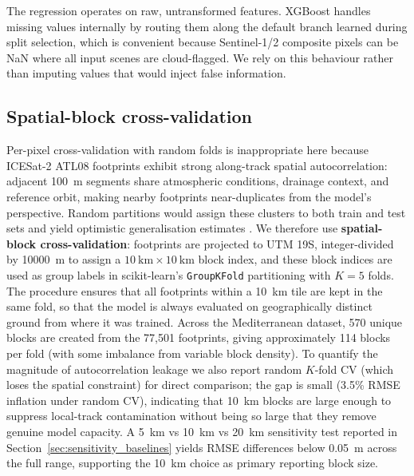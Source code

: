 \documentclass[preprint,authoryear,number]{elsarticle}
\begin{document}


The regression operates on raw, untransformed features. XGBoost handles missing values internally by routing them along the default branch learned during split selection, which is convenient because Sentinel-1/2 composite pixels can be NaN where all input scenes are cloud-flagged. We rely on this behaviour rather than imputing values that would inject false information.

\subsection{Spatial-block cross-validation}
\label{sec:spatial_cv}

Per-pixel cross-validation with random folds is inappropriate here because ICESat-2 ATL08 footprints exhibit strong along-track spatial autocorrelation: adjacent \SI{100}{\meter} segments share atmospheric conditions, drainage context, and reference orbit, making nearby footprints near-duplicates from the model's perspective. Random partitions would assign these clusters to both train and test sets and yield optimistic generalisation estimates \citep{Roberts2017SpatialCV}. We therefore use \textbf{spatial-block cross-validation}: footprints are projected to UTM 19S, integer-divided by \SI{10000}{\meter} to assign a $\SI{10}{\kilo\meter} \times \SI{10}{\kilo\meter}$ block index, and these block indices are used as group labels in scikit-learn's \texttt{GroupKFold} partitioning with $K = 5$ folds. The procedure ensures that all footprints within a \SI{10}{\kilo\meter} tile are kept in the same fold, so that the model is always evaluated on geographically distinct ground from where it was trained. Across the Mediterranean dataset, 570 unique blocks are created from the 77{,}501 footprints, giving approximately 114 blocks per fold (with some imbalance from variable block density). To quantify the magnitude of autocorrelation leakage we also report random $K$-fold CV (which loses the spatial constraint) for direct comparison; the gap is small (3.5\% RMSE inflation under random CV), indicating that \SI{10}{\kilo\meter} blocks are large enough to suppress local-track contamination without being so large that they remove genuine model capacity. A \SI{5}{\kilo\meter} vs \SI{10}{\kilo\meter} vs \SI{20}{\kilo\meter} sensitivity test reported in Section~\ref{sec:sensitivity_baselines} yields RMSE differences below \SI{0.05}{\meter} across the full range, supporting the \SI{10}{\kilo\meter} choice as primary reporting block size.
\end{document}
